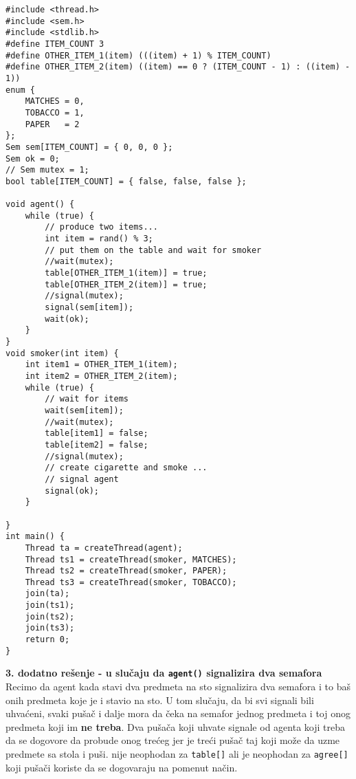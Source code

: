 \begin{lstlisting}
#include <thread.h>
#include <sem.h>
#include <stdlib.h>
#define ITEM_COUNT 3
#define OTHER_ITEM_1(item) (((item) + 1) % ITEM_COUNT)
#define OTHER_ITEM_2(item) ((item) == 0 ? (ITEM_COUNT - 1) : ((item) - 1))
enum {
    MATCHES = 0,
    TOBACCO = 1,
    PAPER   = 2
};
Sem sem[ITEM_COUNT] = { 0, 0, 0 };
Sem ok = 0;
// Sem mutex = 1;
bool table[ITEM_COUNT] = { false, false, false };

void agent() {
    while (true) {
        // produce two items...
        int item = rand() % 3;
        // put them on the table and wait for smoker
        //wait(mutex);
        table[OTHER_ITEM_1(item)] = true;
        table[OTHER_ITEM_2(item)] = true;
        //signal(mutex);
        signal(sem[item]);
        wait(ok);
    }
}
void smoker(int item) {
    int item1 = OTHER_ITEM_1(item);
    int item2 = OTHER_ITEM_2(item);
    while (true) {
		// wait for items
		wait(sem[item]);
        //wait(mutex);
		table[item1] = false;
		table[item2] = false;
        //signal(mutex);
        // create cigarette and smoke ...
		// signal agent
        signal(ok); 
    }
    
}
int main() {
    Thread ta = createThread(agent);
    Thread ts1 = createThread(smoker, MATCHES);
    Thread ts2 = createThread(smoker, PAPER);
    Thread ts3 = createThread(smoker, TOBACCO);
    join(ta);
    join(ts1);
    join(ts2);
    join(ts3);
    return 0;
}

\end{lstlisting}
\newpage
\textbf{\large 3. dodatno re\v{s}enje - u slu\v{c}aju da \texttt{agent()} signalizira dva semafora}\\
Recimo da agent kada stavi dva predmeta na sto signalizira dva semafora i to ba\v{s} onih predmeta koje je i stavio na sto. U tom slu\v{c}aju, da bi svi signali bili uhva\'{c}eni, svaki pu\v{s}a\v{c} i dalje mora da \v{c}eka na semafor jednog predmeta i toj onog predmeta koji im \textbf{ne treba}. Dva pu\v{s}a\v{c}a koji uhvate signale od agenta koji treba da se dogovore da probude onog tre\'{c}eg jer je tre\'{c}i pu\v{s}a\v{c} taj koji mo\v{z}e da uzme predmete sa stola i pu\v{s}i.  nije neophodan za \texttt{table[]} ali je neophodan za \texttt{agree[]} koji pu\v{s}a\v{c}i koriste da se dogovaraju na pomenut na\v{c}in.

